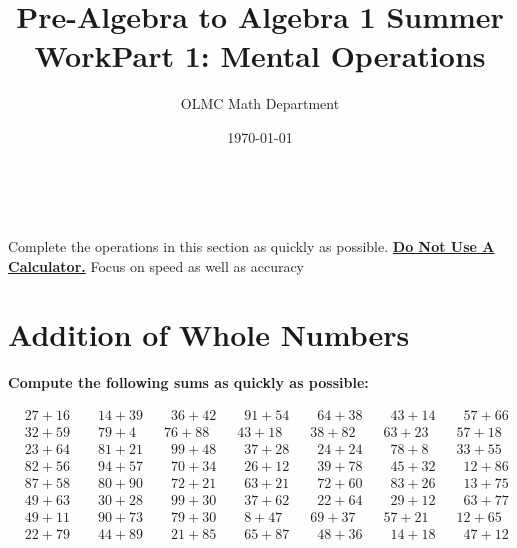 \documentclass{article}
\title{Pre-Algebra to Algebra 1 Summer Work}
\author{OLMC Math Department}
\date{\today}
\begin{document}
\maketitle
\newpage\
\begin{center}
	\title{{\huge \textbf{Part 1: Mental Operations}} }

Complete the operations in this section as quickly as possible. \textbf{\underline{Do Not Use A Calculator.}} Focus on speed as well as accuracy
\end{center}


\section{Addition of Whole Numbers}

\textbf{Compute the following sums as quickly as possible:}

\bigskip

\(\begin{aligned}
	&27+16 \qquad 14+39 \qquad 36+42 \qquad 91+54 \qquad 64+38 \qquad 43+14 \qquad 57+66 \\[2em]
	&32+59 \qquad 79+4  \qquad 76+88 \qquad 43+18 \qquad 38+82 \qquad 63+23 \qquad 57+18 \\[2em]
	&23+64 \qquad 81+21 \qquad 99+48 \qquad 37+28 \qquad 24+24 \qquad 78+8  \qquad 33+55 \\[2em]
	&82+56 \qquad 94+57 \qquad 70+34 \qquad 26+12 \qquad 39+78 \qquad 45+32 \qquad 12+86 \\[2em]
	&87+58 \qquad 80+90 \qquad 72+21 \qquad 63+21 \qquad 72+60 \qquad 83+26 \qquad 13+75 \\[2em]
	&49+63 \qquad 30+28 \qquad 99+30 \qquad 37+62 \qquad 22+64 \qquad 29+12 \qquad 63+77 \\[2em]
	&49+11 \qquad 90+73 \qquad 79+30 \qquad 8+47  \qquad 69+37 \qquad 57+21 \qquad 12+65 \\[2em]
	&22+79 \qquad 44+89 \qquad 21+85 \qquad 65+87 \qquad 48+36 \qquad 14+18 \qquad 47+12 \\\\
\end{aligned}\)
\end{document}
